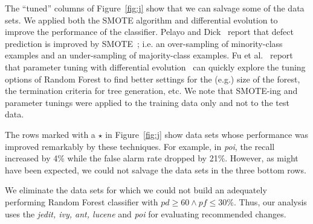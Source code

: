 \documentclass[twocolumn,5p]{elsarticle}
\newcommand{\bi}{\begin{itemize}[leftmargin=0.4cm]}
\newcommand{\ei}{\end{itemize}}
\newcommand{\fig}[1]{Figure~\ref{fig:#1}}
\theoremstyle{break}
\begin{document}
\begin{itemize}
		The ``tuned'' columns of \fig{j} show that we can salvage some of the data sets. We applied both the SMOTE algorithm and differential evolution to improve the performance of the classifier. Pelayo and Dick~\cite{pelayo07} report that defect prediction is improved by SMOTE~\cite{Chawla2002}; i.e. an over-sampling of minority-class examples and an under-sampling of majority-class examples. Fu et al.~\cite{fu:ase15} report that parameter tuning with differential evolution~\cite{storn97} can quickly explore the tuning options of Random Forest to find better settings for the (e.g.) size of the forest, the termination criteria
		for tree generation, etc. We note that SMOTE-ing and
		parameter tunings were applied to the training data only and not to the test data.
		
		The rows \colorbox{celadon}{marked with a $\star$} in \fig{j} show data sets whose performance was improved remarkably by these techniques. For example, in {\em poi}, the recall increased by 4\% while the false alarm rate dropped by 21\%. However, as might have been expected, we could not salvage the data sets in the  three bottom rows.
		
		We eliminate the data sets for which we could not build an adequately performing Random Forest classifier with $\mathit{pd}\ge 60 \wedge \mathit{pf} \le 30$\%. Thus, our analysis uses the {\em jedit, ivy, ant, lucene} and {\em poi} for evaluating recommended changes.
		
		
		
%		
		

\end{itemize}
\end{document}
